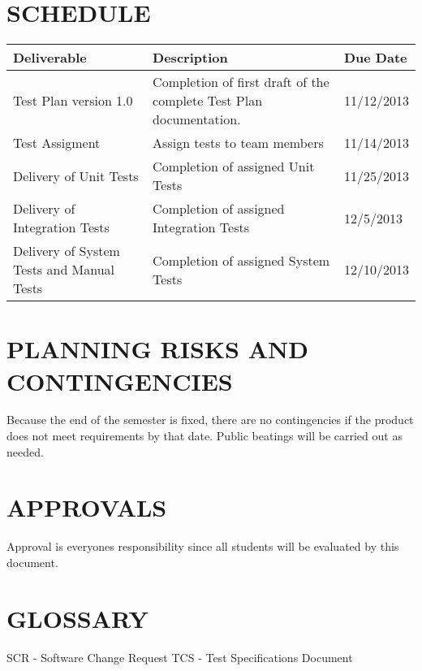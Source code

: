 \documentclass[report]{article}
\begin{document}
\section[SCHEDULE]{SCHEDULE}
\begin{center}
\begin{tabularx}{\textwidth}{| X | X | X |}
  \hline
  \textbf{Deliverable} &
  \textbf{Description} &
  \textbf{Due Date} 
\\ \hline
Test Plan version 1.0 & 
Completion of first draft of the complete Test Plan documentation. &
11/12/2013
\\ \hline

Test Assigment &
Assign tests to team members &
11/14/2013
\\ \hline

Delivery of Unit Tests &
Completion of assigned Unit Tests &
11/25/2013
\\ \hline

Delivery of Integration Tests &
Completion of assigned Integration Tests &
12/5/2013
\\ \hline

Delivery of System Tests and Manual Tests &
Completion of assigned System Tests &
12/10/2013
\\ \hline

\end{tabularx}
\end{center}

\section[PLANNING RISKS AND CONTINGENCIES]{PLANNING RISKS AND CONTINGENCIES}
Because the end of the semester is fixed, there are no contingencies if the product does not meet requirements by that date. Public beatings will be carried out as needed.

\section[APPROVALS]{APPROVALS}

Approval is everyones responsibility since all students will be evaluated by this document.

\section[GLOSSARY]{GLOSSARY}
SCR - Software Change Request
TCS - Test Specifications Document
\end{document}
